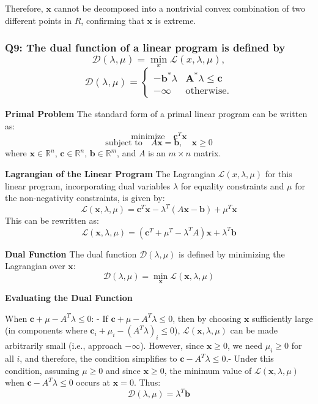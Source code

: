 \documentclass[8pt]{article}
\begin{document}
Therefore, \(\mathbf{x}\) cannot be decomposed into a nontrivial convex combination of two different points in \(R\), confirming that \(\mathbf{x}\) is extreme.

\subsubsection*{Q9: The dual function of a linear program is defined by
\[ \mathcal{D}(\lambda, \mu) = \min_x \mathcal{L}(x, \lambda, \mu), \]
\[ \mathcal{D}(\lambda, \mu) = \begin{cases} 
-\mathbf{b}^* \lambda & \mathbf{A}^* \lambda \leq \mathbf{c} \\
-\infty & \text{otherwise}.
\end{cases} \]}

\textbf{Primal Problem}
The standard form of a primal linear program can be written as:
\[
\text{minimize} \quad \mathbf{c}^T \mathbf{x}
\]
\[
\text{subject to} \quad A\mathbf{x} = \mathbf{b}, \quad \mathbf{x} \geq 0
\]
where \( \mathbf{x} \in \mathbb{R}^n \), \( \mathbf{c} \in \mathbb{R}^n \), \( \mathbf{b} \in \mathbb{R}^m \), and \( A \) is an \( m \times n \) matrix.

\textbf{Lagrangian of the Linear Program}
The Lagrangian \(\mathcal{L}(x, \lambda, \mu)\) for this linear program, incorporating dual variables \(\lambda\) for equality constraints and \(\mu\) for the non-negativity constraints, is given by:
\[
\mathcal{L}(\mathbf{x}, \lambda, \mu) = \mathbf{c}^T \mathbf{x} - \lambda^T (A\mathbf{x} - \mathbf{b}) + \mu^T \mathbf{x}
\]
This can be rewritten as:
\[
\mathcal{L}(\mathbf{x}, \lambda, \mu) = (\mathbf{c}^T + \mu^T - \lambda^T A) \mathbf{x} + \lambda^T \mathbf{b}
\]

\textbf{Dual Function}
The dual function \(\mathcal{D}(\lambda, \mu)\) is defined by minimizing the Lagrangian over \(\mathbf{x}\):
\[
\mathcal{D}(\lambda, \mu) = \min_{\mathbf{x}} \mathcal{L}(\mathbf{x}, \lambda, \mu)
\]

\textbf{Evaluating the Dual Function}

When \(\mathbf{c} + \mu - A^T \lambda \leq 0\):
         - If \(\mathbf{c} + \mu - A^T \lambda \leq 0\), then by choosing \(\mathbf{x}\) sufficiently large (in components where \(\mathbf{c}_i + \mu_i  - (A^T \lambda)_i \leq 0\)), \(\mathcal{L}(\mathbf{x}, \lambda, \mu)\) can be made arbitrarily small (i.e., approach \(-\infty\)). However, since \(\mathbf{x} \geq 0\), we need \(\mu_i \geq 0\) for all \(i\), and therefore, the condition simplifies to \(\mathbf{c} - A^T \lambda \leq 0\).- Under this condition, assuming \(\mu \geq 0\) and since \(\mathbf{x} \geq 0\), the minimum value of \(\mathcal{L}(\mathbf{x}, \lambda, \mu)\) when \(\mathbf{c} - A^T \lambda \leq 0\) occurs at \(\mathbf{x} = 0\). Thus:
         \[\mathcal{D}(\lambda, \mu) = \lambda^T \mathbf{b} \]
    
\end{document}
